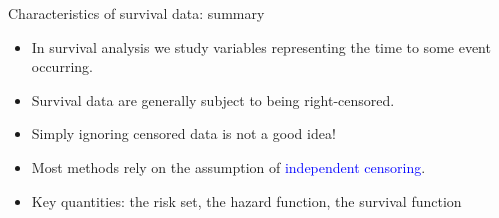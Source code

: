 \documentclass[10pt,t]{beamer}
\begin{document}
\begin{frame}{Characteristics of survival data: summary}
	\begin{itemize}
		\item In survival analysis we study variables representing the time to some event occurring.
		
		\medskip
		
		\item Survival data are generally subject to being right-censored.
		
		\medskip
		
		\item Simply ignoring censored data is not a good idea!
		
		\medskip
		
		\item Most methods rely on the assumption of \textcolor{blue}{independent censoring}.
		
		\medskip
		
		\item Key quantities: the risk set, the hazard function, the survival function
	\end{itemize}
\end{frame}
\end{document}
